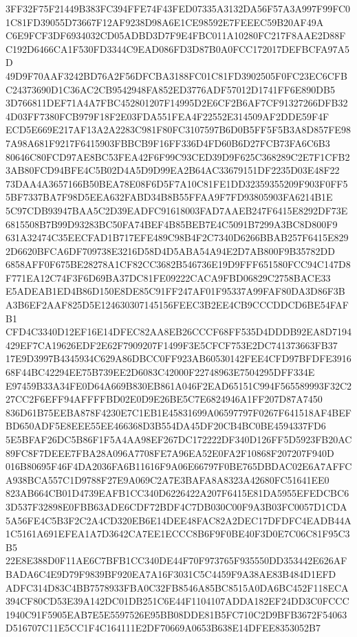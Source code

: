 \documentclass[UTF8,fontset=fandol,zihao=-4,a4paper]{ctexart}
\begin{document}
{{3FF32F75F21449B383FC394FFE74F43FED07335A3132DA56F57A3A997F99FC01C81FD39055D73667F12AF9238D98A6E1CE98592E7FEEEC59B20AF49A
C6E9FCF3DF6934032CD05ADBD3D7F9E4FBC011A10280FC217F8AAE2D88FC192D6466CA1F530FD3344C9EAD086FD3D87B0A0FCC172017DEFBCFA97A5D
49D9F70AAF3242BD76A2F56DFCBA3188FC01C81FD3902505F0FC23EC6CFBC24373690D1C36AC2CB9542948FA852ED3776ADF57012D1741FF6E890DB5
3D766811DEF71A4A7FBC452801207F14995D2E6CF2B6AF7CF91327266DFB324D03FF7380FCB979F18F2E03FDA551FEA4F22552E314509AF2DDE59F4F
ECD5E669E217AF13A2A2283C981F80FC3107597B6D0B5FF5F5B3A8D857FE987A98A681F9217F6415903FBBCB9F16FF336D4FD60B6D27FCB73FA6C6B3
80646C80FCD97AE8BC53FEA42F6F99C93CED39D9F625C368289C2E7F1CFB23AB80FCD94BFE4C5B02D4A5D9D99EA2B64AC33679151DF2235D03E48F22
73DAA4A3657166B50BEA78E08F6D5F7A10C81FE1DD32359355209F903F0FF55BF7337BA7F98D5EEA632FABD34B8B55FFAA9F7FD93805903FA6214B1E
5C97CDB93947BAA5C2D39EADFC91618003FAD7AAEB247F6415E8292DF73E6815508B7B99D93283BC50FA74BEF4B85BEB7E4C5091B7299A3BC8D800F9
631A32474C35EECFAD1B717EFE489C98B4F2C7340D6266BBAB257F6415E8292D6620BFCA6DF709738E3216D58D4D5ABA54A94E2D7AB800F9B35782DD
6858AFF0F675BE28278A1CF82CC3682B546736E19D9FFF651580FCC94C147D8F771EA12C74F3F6D69BA37DC81FE09222CACA9FBD06829C2758BACE33
E5ADEAB1ED4B86D150E8DE85C91FF247AF01F95337A99FAF80DA3D86F3BA3B6EF2AAF825D5E124630307145156FEEC3B2EE4CB9CCCDDCD6BE54FAFB1
CFD4C3340D12EF16E14DFEC82AA8EB26CCCF68FF535D4DDDB92EA8D7194429EF7CA19626EDF2E62F7909207F1499F3E5CFCF753E2DC741373663FB37
17E9D3997B4345934C629A86DBCC0FF923AB60530142FEE4CFD97BFDFE391668F44BC42294EE75B739EE2D6083C42000F22748963E7504295DFF334E
E97459B33A34FE0D64A669B830EB861A046F2EAD65151C994F565589993F32C227CC2F6EFF94AFFFFBD02E0D9E26BE5C7E6824946A1FF207D87A7450
836D61B75EEBA878F4230E7C1EB1E45831699A06597797F0267F641518AF4BEFBD650ADF5E8EEE55EE466368D3B554DA45DF20CB4BC0BE4594337FD6
5E5BFAF26DC5B86F1F5A4AA98EF267DC172222DF340D126FF5D5923FB20AC89FC8F7DEEE7FBA28A096A7708FE7A96EA52E0FA2F10868F207207F940D
016B80695F46F4DA2036FA6B11616F9A06E66797F0BE765DBDAC02E6A7AFFCA938BCA557C1D9788F27E9A069C2A7E3BAFA8A8323A42680FC51641EE0
823AB664CB01D4739EAFB1CC340D6226422A207F6415E81DA5955EFEDCBC63D537F32898E0FBB63ADE6CDF72BDF4C7DB030C00F9A3B03FC0057D1CDA
5A56FE4C5B3F2C2A4CD320EB6E14DEE48FAC82A2DEC17DFDFC4EADB44A1C5161A691EFEA1A7D3642CA7EE1ECCC8B6F9F0BE40F3D0E7C06C81F95C3B5
22E8E388D0F11AE6C7BFB1CC340DE44F70F973765F935550DD353442E626AFBADA6C4E9D79F9839BF920EA7A16F3031C5C4459F9A38AE83B484D1EFD
ADFC314D83C4BB7578933FBA0C32FB8546A85BC8515A0DA6BC452F118ECA394CF80CD53E39A142DC01DB251C6E44F1104107ADDA182EF24DD3C0FCCC
1940C91F5905EAB7E5E5597526E95BB08DDE81B5FC710C2D9BFB3672F54063D516707C11E5CC1F4C164111E2DF70669A0653B638E14DFEE8353052B7
}}
\end{document}
